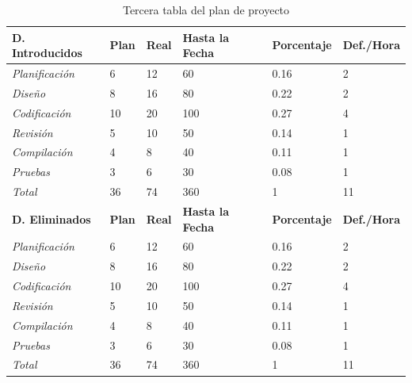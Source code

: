 \documentclass[a4paper,12pt,openany,oneside]{book}
\begin{document}
\newpage
\begin{table}[!ht]
\begin{tabular}{| l | l | l | l | l | l |}
\hline
\textbf{D. Introducidos} & \textbf{Plan} & \textbf{Real} & \textbf{Hasta la Fecha} & \textbf{Porcentaje} & \textbf{Def./Hora} \\
\hline
\textit{Planificación} &  6 & 12 & 60 & 0.16 & 2\\
\hline
\textit{Diseño} &		  8 & 16 & 80 & 0.22 & 2\\
\hline
\textit{Codificación} &  10 & 20 &100 & 0.27 & 4\\
\hline
\textit{Revisión} &       5 & 10 & 50 & 0.14 & 1\\
\hline
\textit{Compilación} &    4 &  8 & 40 & 0.11 & 1\\
\hline
\textit{Pruebas} &        3 &  6 & 30 & 0.08 & 1\\
\hline
\textit{Total} &         36 & 74 & 360& 1 & 11 \\
\hline
\textbf{D. Eliminados} & \textbf{Plan} & \textbf{Real} & \textbf{Hasta la Fecha} & \textbf{Porcentaje} & \textbf{Def./Hora} \\
\hline
\textit{Planificación} &  6 & 12 & 60 & 0.16 & 2\\
\hline
\textit{Diseño} &		  8 & 16 & 80 & 0.22 & 2\\
\hline
\textit{Codificación} &  10 & 20 &100 & 0.27 & 4\\
\hline
\textit{Revisión} &       5 & 10 & 50 & 0.14 & 1\\
\hline
\textit{Compilación} &    4 &  8 & 40 & 0.11 & 1\\
\hline
\textit{Pruebas} &        3 &  6 & 30 & 0.08 & 1\\
\hline
\textit{Total} &         36 & 74 & 360& 1 & 11 \\
\hline
\end{tabular}
\caption{Tercera tabla del plan de proyecto}
\end{table}
\end{document}
